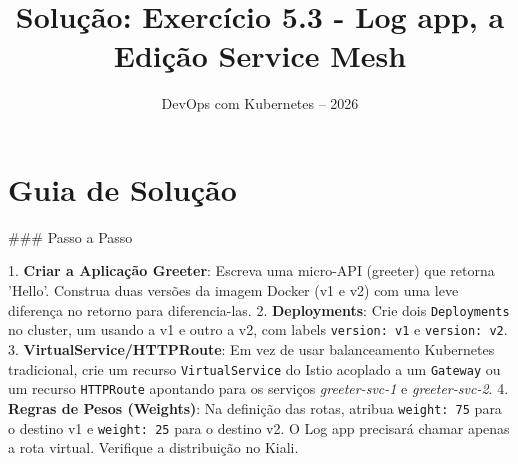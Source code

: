 \documentclass[11pt,a4paper]{article}
\title{\color{secondary}\Huge\textbf{Solução: Exercício 5.3 - Log app, a Edição Service Mesh}}
\author{\color{primary}DevOps com Kubernetes -- 2026}
\date{}
\begin{document}
\maketitle

\section*{\color{primary}Guia de Solução}
\begin{tcolorbox}[colback=green!5!white,colframe=green!60!black,title=Resolução Passo a Passo]
### Passo a Passo

1. \textbf{Criar a Aplicação Greeter}: Escreva uma micro-API (greeter) que retorna 'Hello'. Construa duas versões da imagem Docker (v1 e v2) com uma leve diferença no retorno para diferencia-las.
2. \textbf{Deployments}: Crie dois \texttt{Deployments} no cluster, um usando a v1 e outro a v2, com labels \texttt{version: v1} e \texttt{version: v2}.
3. \textbf{VirtualService/HTTPRoute}: Em vez de usar balanceamento Kubernetes tradicional, crie um recurso \texttt{VirtualService} do Istio acoplado a um \texttt{Gateway} ou um recurso \texttt{HTTPRoute} apontando para os serviços \textit{greeter-svc-1} e \textit{greeter-svc-2}.
4. \textbf{Regras de Pesos (Weights)}: Na definição das rotas, atribua \texttt{weight: 75} para o destino v1 e \texttt{weight: 25} para o destino v2. O Log app precisará chamar apenas a rota virtual. Verifique a distribuição no Kiali.
\end{tcolorbox}
\end{document}
